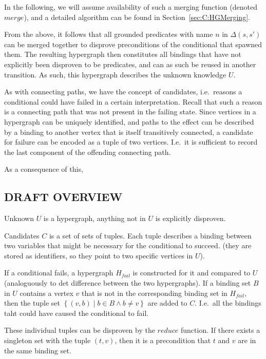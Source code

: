 \documentclass[../Master.tex]{subfiles}
\begin{document}
In the following, we will assume availability of such a merging function (denoted $merge$), and a detailed algorithm can be found in Section~\ref{sec:C:HGMerging}.

From the above, it follows that all grounded predicates with name $n$ in $\Delta\left(s, s'\right)$ can be merged together to disprove preconditions of the conditional that spawned them. The resulting hypergraph then constitutes all bindings that have not explicitly been disproven to be predicates, and can as such be reused in another transition. As such, this hypergraph describes the unknown knowledge $U$.

As with connecting paths, we have the concept of candidates, i.e.\ reasons a conditional could have failed in a certain interpretation. Recall that such a reason is a connecting path that was not present in the failing state. Since vertices in a hypergraph can be uniquely identified, and paths to the effect can be described by a binding to another vertex that is itself transitively connected, a candidate for failure can be encoded as a tuple of two vertices. I.e.\ it is sufficient to record the last component of the offending connecting path.

As a consequence of this, 

\subsection{DRAFT OVERVIEW}

Unknown $U$ is a hypergraph, anything not in $U$ is explicitly disproven.

Candidates $C$ is a set of sets of tuples. Each tuple describes a binding between two variables that might be necessary for the conditional to succeed. (they are stored as identifiers, so they point to two specific vertices in $U$). 

If a conditional fails, a hypergraph $H_{fail}$ is constructed for it and compared to $U$ (analoguously to det difference between the two hypergraphs). If a binding set $B$ in $U$ contains a vertex $v$ that is not in the corresponding binding set in $H_{fail}$, then the tuple set $\left\{ (v, b) \mid b \in B \land b \neq v \right\}$ are added to $C$. I.e.\ all the bindings taht could have caused the conditional to fail.

These individual tuples can be disproven by the $reduce$ function. If there exists a singleton set with the tuple $(t, v)$, then it is a precondition that $t$ and $v$ are in the same binding set.
\end{document}
